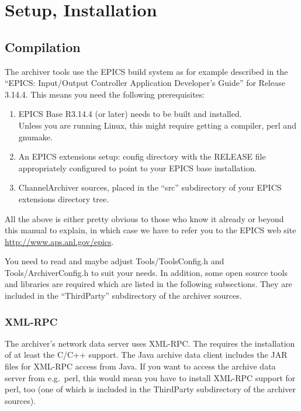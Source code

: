 \chapter{Setup, Installation} \label{sec:install}

\section{Compilation}
The archiver tools use the EPICS build system as for example described
in the ``EPICS: Input/Output Controller Application Developer's
Guide'' for Release 3.14.4.  This means you need the following
prerequisites:
\begin{enumerate}
\item EPICS Base R3.14.4 (or later) needs to be built and installed.\\
      Unless you are running Linux, this might require getting a
      compiler, perl and gnumake.
\item An EPICS extensions setup: config directory with the RELEASE
      file appropriately configured to point to your EPICS base installation.
\item ChannelArchiver sources, placed in the ``src'' subdirectory of
      your EPICS extensions directory tree. 
\end{enumerate}

\noindent All the above is either pretty obvious to those who know it
already or beyond this manual to explain, in which case we have to
refer you to the EPICS web site
\href{http://www.aps.anl.gov/epics}{http://www.aps.anl.gov/epics}. 

You need to read and maybe adjust Tools/ToolsConfig.h and
Tools/ArchiverConfig.h to suit your needs.  In addition, some open
source tools and libraries are required which are listed in the
following subsections. They are included in the ``ThirdParty''
subdirectory of the archiver sources.

\subsection{XML-RPC}
The archiver's network data server uses XML-RPC. The  requires the installation of at least the C/C++ support. The
Java archive data client includes the JAR files for XML-RPC access
from Java. If you want to access the archive data server from e.g.\ perl,
this would mean you have to install XML-RPC support for perl, too
(one of which is included in the ThirdParty subdirectory of the
archiver sources).

